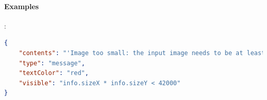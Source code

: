 \paragraph{Examples}:\\
\begin{lstlisting}[language=json,firstnumber=1]
{    
    "contents": "'Image too small: the input image needs to be at least 42000 pixels to get a reliable estimate<br> Forced to use one bin for the estimation.'", 
    "type": "message", 
    "textColor": "red",
    "visible": "info.sizeX * info.sizeY < 42000" 
}
\end{lstlisting}
